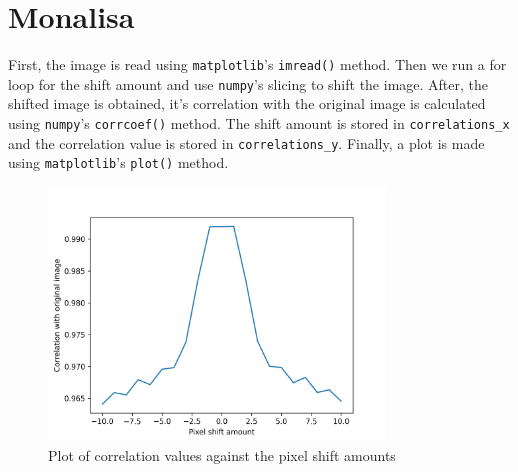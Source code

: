 \section{Monalisa}
First, the image is read using \texttt{matplotlib}'s \texttt{imread()} method.
Then we run a for loop for the shift amount and use \texttt{numpy}'s slicing to shift the image.
After, the shifted image is obtained, it's correlation with the original image is calculated using \texttt{numpy}'s \texttt{corrcoef()} method.
The shift amount is stored in \texttt{correlations\_x} and the correlation value is stored in \texttt{correlations\_y}.
Finally, a plot is made using \texttt{matplotlib}'s \texttt{plot()} method.

\begin{figure}[H]
	\centering
	\includegraphics[width=0.8\textwidth]{img/correlation.png}
	\caption{Plot of correlation values against the pixel shift amounts}
	\label{fig:correlation}
\end{figure}

